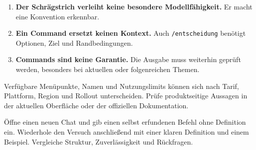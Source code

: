 \begin{enumerate}
\item \textbf{Der Schrägstrich verleiht keine besondere Modellfähigkeit.} Er macht eine Konvention erkennbar.
\item \textbf{Ein Command ersetzt keinen Kontext.} Auch \texttt{/entscheidung} benötigt Optionen, Ziel und Randbedingungen.
\item \textbf{Commands sind keine Garantie.} Die Ausgabe muss weiterhin geprüft werden, besonders bei aktuellen oder folgenreichen Themen.
\end{enumerate}

\begin{achtung}
Verfügbare Menüpunkte, Namen und Nutzungslimits können sich nach Tarif, Plattform, Region und Rollout unterscheiden. Prüfe produktseitige Aussagen in der aktuellen Oberfläche oder der offiziellen Dokumentation.
\end{achtung}

\begin{praxis}
Öffne einen neuen Chat und gib einen selbst erfundenen Befehl ohne Definition ein. Wiederhole den Versuch anschließend mit einer klaren Definition und einem Beispiel. Vergleiche Struktur, Zuverlässigkeit und Rückfragen.
\end{praxis}
